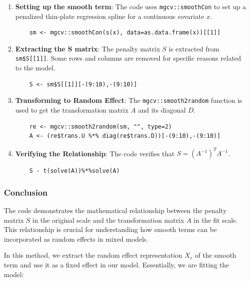 \begin{enumerate}
    \item \textbf{Setting up the smooth term}: The code uses \texttt{mgcv::smoothCon} to set up a penalized thin-plate regression spline for a continuous covariate \( x \).
    \begin{verbatim}
    sm <- mgcv::smoothCon(s(x), data=as.data.frame(x))[[1]]
    \end{verbatim}

    \item \textbf{Extracting the S matrix}: The penalty matrix \( S \) is extracted from \texttt{sm\$S[[1]]}. Some rows and columns are removed for specific reasons related to the model.
    \begin{verbatim}
    S <- sm$S[[1]][-(9:10),-(9:10)]
    \end{verbatim}

    \item \textbf{Transforming to Random Effect}: The \texttt{mgcv::smooth2random} function is used to get the transformation matrix \( A \) and its diagonal \( D \).
    \begin{verbatim}
    re <- mgcv::smooth2random(sm, "", type=2)
    A <- (re$trans.U %*% diag(re$trans.D))[-(9:10),-(9:10)]
    \end{verbatim}

    \item \textbf{Verifying the Relationship}: The code verifies that \( S = (A^{-1})^T A^{-1} \).
    \begin{verbatim}
    S - t(solve(A))%*%solve(A)
    \end{verbatim}
\end{enumerate}

\subsubsection{Conclusion}

The code demonstrates the mathematical relationship between the penalty matrix \( S \) in the original scale and the transformation matrix \( A \) in the fit scale. This relationship is crucial for understanding how smooth terms can be incorporated as random effects in mixed models.





In this method, we extract the random effect representation \(X_r\) of the smooth term and use it as a fixed effect in our model. Essentially, we are fitting the model:

